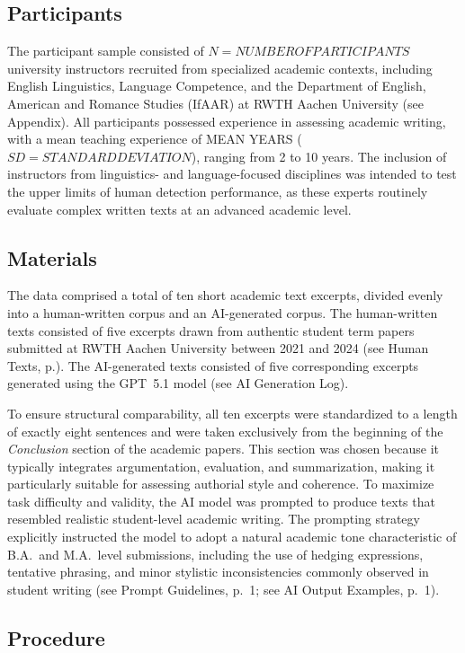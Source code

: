 \documentclass[12pt]{article}
\begin{document}
\subsection{Participants}

The participant sample consisted of $N = NUMBER OF PARTICIPANTS$ university instructors recruited from specialized academic contexts, including English Linguistics, Language Competence, and the Department of English, American and Romance Studies (IfAAR) at RWTH Aachen University (see Appendix). All participants possessed experience in assessing academic writing, with a mean teaching experience of MEAN YEARS ($SD = STANDARD DEVIATION$), ranging from 2 to 10 years. The inclusion of instructors from linguistics- and language-focused disciplines was intended to test the upper limits of human detection performance, as these experts routinely evaluate complex written texts at an advanced academic level.

\subsection{Materials}

The data comprised a total of ten short academic text excerpts, divided evenly into a human-written corpus and an AI-generated corpus. The human-written texts consisted of five excerpts drawn from authentic student term papers submitted at RWTH Aachen University between 2021 and 2024 (see Human Texts, p.). The AI-generated texts consisted of five corresponding excerpts generated using the GPT~5.1 model (see AI Generation Log).

To ensure structural comparability, all ten excerpts were standardized to a length of exactly eight sentences and were taken exclusively from the beginning of the \emph{Conclusion} section of the academic papers. This section was chosen because it typically integrates argumentation, evaluation, and summarization, making it particularly suitable for assessing authorial style and coherence. To maximize task difficulty and validity, the AI model was prompted to produce texts that resembled realistic student-level academic writing. The prompting strategy explicitly instructed the model to adopt a natural academic tone characteristic of B.A.\ and M.A.\ level submissions, including the use of hedging expressions, tentative phrasing, and minor stylistic inconsistencies commonly observed in student writing (see Prompt Guidelines, p.~1; see AI Output Examples, p.~1).

\subsection{Procedure}
\end{document}
